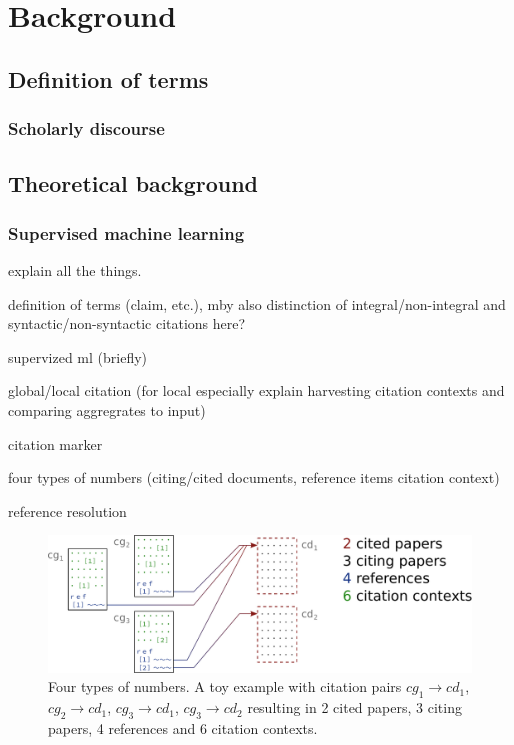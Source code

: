 \chapter{Background}\label{chap:background}

\section{Definition of terms}
\subsection{Scholarly discourse}

\section{Theoretical background}
\subsection{Supervised machine learning}

explain all the things.

definition of terms (claim, etc.), mby also distinction of integral/non-integral and syntactic/non-syntactic citations here?

supervized ml (briefly)

global/local citation (for local especially explain harvesting citation contexts and comparing aggregrates to input)

citation marker

four types of numbers (citing/cited documents, reference items citation context)

reference resolution

\begin{figure}
  \centering
    \includegraphics[width=\textwidth]{figures/background/four_types_of_numbers_vertsqueeze.pdf}
  \caption[Four types of numbers.]{Four types of numbers. A toy example with citation pairs $cg_1\rightarrow cd_1$, $cg_2\rightarrow cd_1$, $cg_3\rightarrow cd_1$, $cg_3\rightarrow cd_2$ resulting in 2 cited papers, 3 citing papers, 4 references and 6 citation contexts.}
  \label{fig:fournumbers}
\end{figure}
